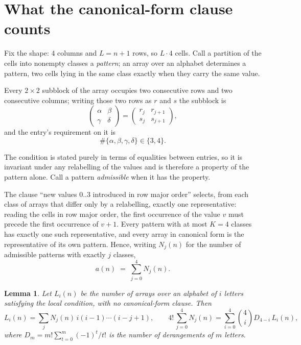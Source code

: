 \documentclass[11pt,a4paper]{article}
\theoremstyle{plain}
\newtheorem{lemma}[theorem]{Lemma}
\theoremstyle{definition}
\begin{document}
\section{What the canonical-form clause counts}

Fix the shape: $4$ columns and $L=n+1$ rows, so $L\cdot4$ cells. Call a
partition of the cells into nonempty classes a \emph{pattern}; an array over an alphabet
determines a pattern, two cells lying in the same class exactly when they carry the same
value.

Every $2\times2$ subblock of the array occupies two consecutive
rows and two consecutive columns; writing those two rows as $r$ and $s$ the
subblock is
\[
\begin{pmatrix}\alpha&\beta\\\gamma&\delta\end{pmatrix}=\begin{pmatrix}r_j&r_{j+1}\\s_j&s_{j+1}\end{pmatrix},
\]
and the entry's requirement on it is
\begin{equation}\label{eq:loc}
\#\{\alpha,\beta,\gamma,\delta\}\in\{3,4\}.
\end{equation}

The condition is stated purely in terms of equalities between entries, so it is invariant
under any relabelling of the values and is therefore a property of the pattern alone. Call a
pattern \emph{admissible} when it has the property.

The clause ``new values $0..3$ introduced in row major order'' selects, from each class
of arrays that differ only by a relabelling, exactly one representative: reading the cells in
row major order, the first occurrence of the value $v$ must precede the first occurrence of
$v+1$. Every pattern with at most $K=4$ classes has exactly one such representative, and
every array in canonical form is the representative of its own pattern. Hence, writing
$N_j(n)$ for the number of admissible patterns with exactly $j$ classes,
\begin{equation}\label{eq:apat}
a(n)\;=\;\sum_{j=0}^{4}N_j(n).
\end{equation}

\begin{lemma}\label{lem:inv}
Let $L_i(n)$ be the number of arrays over an alphabet of $i$ letters satisfying the local
condition, with no canonical-form clause. Then
\[
L_i(n)=\sum_j N_j(n)\,i(i-1)\cdots(i-j+1),
\qquad
4!\,\sum_{j=0}^{4}N_j(n)=\sum_{i=0}^{4}\binom{4}{i}D_{4-i}\,L_i(n),
\]
where $D_m=m!\sum_{t=0}^{m}(-1)^t/t!$ is the number of derangements of $m$ letters.
\end{lemma}
\end{document}
